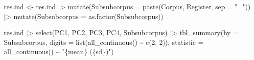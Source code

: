 \documentclass[
  letterpaper,
  DIV=11,
  numbers=noendperiod]{scrreprt}
\newenvironment{Shaded}{\begin{snugshade}}{\end{snugshade}}
\newcommand{\AttributeTok}[1]{\textcolor[rgb]{0.40,0.45,0.13}{#1}}
\newcommand{\DecValTok}[1]{\textcolor[rgb]{0.68,0.00,0.00}{#1}}
\newcommand{\FunctionTok}[1]{\textcolor[rgb]{0.28,0.35,0.67}{#1}}
\newcommand{\NormalTok}[1]{\textcolor[rgb]{0.00,0.23,0.31}{#1}}
\newcommand{\OtherTok}[1]{\textcolor[rgb]{0.00,0.23,0.31}{#1}}
\newcommand{\SpecialCharTok}[1]{\textcolor[rgb]{0.37,0.37,0.37}{#1}}
\newcommand{\StringTok}[1]{\textcolor[rgb]{0.13,0.47,0.30}{#1}}
\begin{document}
\begin{Shaded}
\begin{Highlighting}[]
\NormalTok{res.ind }\OtherTok{\textless{}{-}}\NormalTok{ res.ind }\SpecialCharTok{|\textgreater{}} 
  \FunctionTok{mutate}\NormalTok{(}\AttributeTok{Subsubcorpus =} \FunctionTok{paste}\NormalTok{(Corpus, Register, }\AttributeTok{sep =} \StringTok{"\_"}\NormalTok{)) }\SpecialCharTok{|\textgreater{}} 
  \FunctionTok{mutate}\NormalTok{(}\AttributeTok{Subsubcorpus =} \FunctionTok{as.factor}\NormalTok{(Subsubcorpus))}
  
\NormalTok{res.ind }\SpecialCharTok{|\textgreater{}} 
  \FunctionTok{select}\NormalTok{(PC1, PC2, PC3, PC4, Subsubcorpus) }\SpecialCharTok{|\textgreater{}} 
  \FunctionTok{tbl\_summary}\NormalTok{(}\AttributeTok{by =}\NormalTok{ Subsubcorpus,}
              \AttributeTok{digits =} \FunctionTok{list}\NormalTok{(}\FunctionTok{all\_continuous}\NormalTok{() }\SpecialCharTok{\textasciitilde{}} \FunctionTok{c}\NormalTok{(}\DecValTok{2}\NormalTok{, }\DecValTok{2}\NormalTok{)),}
              \AttributeTok{statistic =} \FunctionTok{all\_continuous}\NormalTok{() }\SpecialCharTok{\textasciitilde{}}  \StringTok{"\{mean\} (\{sd\})"}\NormalTok{)}
\end{Highlighting}
\end{Shaded}
\end{document}
